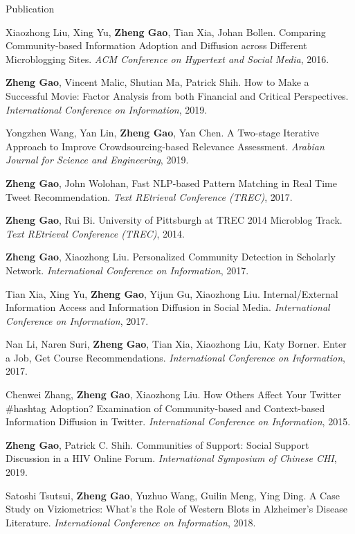 \begin{spacing}{1.0}
\begin{cv}{}
\begin{cvlist}{Publication}
		\item Xiaozhong Liu, Xing Yu, \textbf{Zheng Gao}, Tian Xia, Johan Bollen. Comparing Community-based Information Adoption and Diffusion across Different Microblogging Sites. \textit{ACM Conference on Hypertext and Social Media}, 2016.
		\item \textbf{Zheng Gao}, Vincent Malic, Shutian Ma, Patrick Shih. How to Make a Successful Movie: Factor Analysis from both Financial and Critical Perspectives. \textit{International Conference on Information}, 2019.
		\item Yongzhen Wang, Yan Lin, \textbf{Zheng Gao}, Yan Chen. A Two-stage Iterative Approach to Improve Crowdsourcing-based Relevance Assessment. \textit{Arabian Journal for Science and Engineering}, 2019.
		\item \textbf{Zheng Gao}, John Wolohan, Fast NLP-based Pattern Matching in Real Time Tweet Recommendation. \textit{Text REtrieval Conference (TREC)}, 2017.
		\item \textbf{Zheng Gao}, Rui Bi. University of Pittsburgh at TREC 2014 Microblog Track. 
		\textit{Text REtrieval Conference (TREC)}, 2014.
		\item \textbf{Zheng Gao}, Xiaozhong Liu. Personalized Community Detection in Scholarly Network. \textit{International Conference on Information}, 2017.
		\item Tian Xia, Xing Yu, \textbf{Zheng Gao}, Yijun Gu, Xiaozhong Liu. Internal/External Information Access and Information Diffusion in Social Media. \textit{International Conference on Information}, 2017.
		\item Nan Li, Naren Suri, \textbf{Zheng Gao}, Tian Xia, Xiaozhong Liu, Katy Borner. Enter a Job, Get Course Recommendations. \textit{International Conference on Information}, 2017.
		
		\item Chenwei Zhang, \textbf{Zheng Gao}, Xiaozhong Liu. How Others Affect Your Twitter \#hashtag Adoption? Examination of Community-based and Context-based Information Diffusion in Twitter. \textit{International Conference on Information}, 2015. 
		\item \textbf{Zheng Gao}, Patrick C. Shih. Communities of Support: Social Support Discussion in a HIV Online Forum. \textit{International Symposium of Chinese CHI}, 2019.
		\item Satoshi Tsutsui, \textbf{Zheng Gao}, Yuzhuo Wang, Guilin Meng, Ying Ding. A Case Study on Viziometrics: What’s the Role of Western Blots in Alzheimer’s Disease Literature. \textit{International Conference on Information}, 2018.
	\end{cvlist}
	
\date{}
\end{cv}
\end{spacing}
